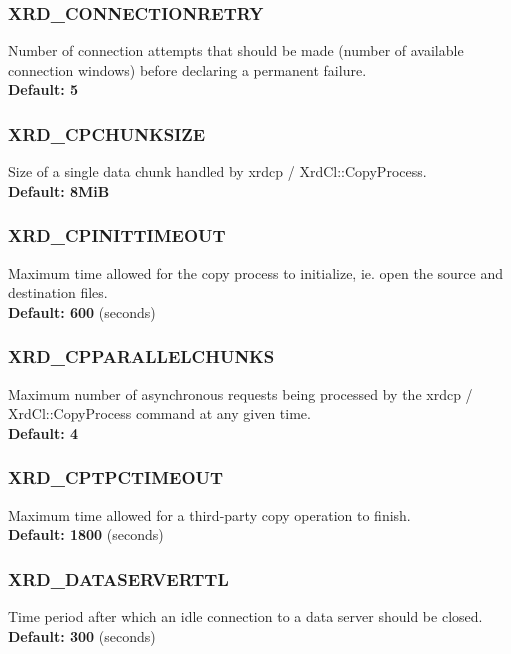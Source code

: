 \documentclass{article}
\begin{document}
		\subsubsection{XRD_CONNECTIONRETRY}
		\label{env:connectionretry}
		    Number of connection attempts that should be made (number of available connection windows) before declaring 
		    a permanent failure. \\
		    \textbf{Default: 5}
		
		\subsubsection{XRD_CPCHUNKSIZE}
		\label{env:cpchunksize}
		    Size of a single data chunk handled by xrdcp / XrdCl::CopyProcess. \\
		    \textbf{Default: 8MiB}
		    		
		\subsubsection{XRD_CPINITTIMEOUT}
		\label{env:cpinittimeout}
		    Maximum time allowed for the copy process to initialize, ie. open the source and destination files. \\
		    \textbf{Default: 600} (seconds)
		    
		\subsubsection{XRD_CPPARALLELCHUNKS}
		\label{env:cpparallelchunks}
		    Maximum number of asynchronous requests being processed by the xrdcp / XrdCl::CopyProcess command at any given 
		    time. \\
		    \textbf{Default: 4}
		    
		\subsubsection{XRD_CPTPCTIMEOUT}
		\label{env:cptpctimeout}
		    Maximum time allowed for a third-party copy operation to finish. \\
		    \textbf{Default: 1800} (seconds)
		    
		\subsubsection{XRD_DATASERVERTTL}
		\label{env:dataserverttl}
		    Time period after which an idle connection to a data server should
		    be closed. \\
		    \textbf{Default: 300} (seconds)
		    
\end{document}
